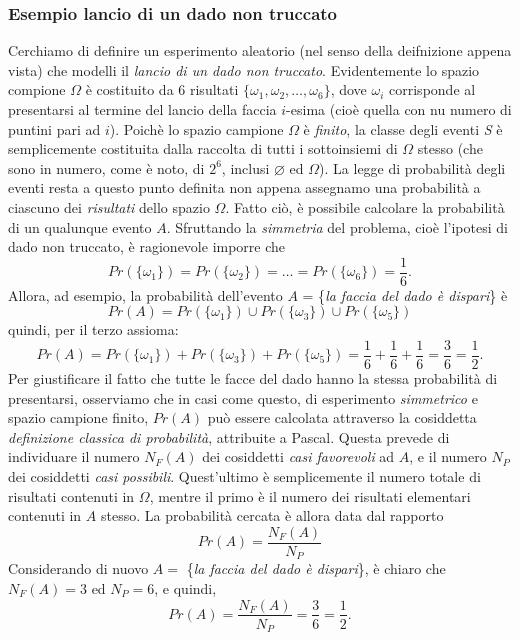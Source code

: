 \documentclass[12pt,oneside,openany]{memoir}
\numberwithin{equation}{subsection}
\begin{document}
\subsubsection{Esempio lancio di un dado non truccato}
Cerchiamo di definire un esperimento aleatorio (nel senso della deifnizione
appena vista) che modelli il \textit{lancio di un dado non truccato}.
Evidentemente lo spazio compione $\Omega$ \`e costituito da $6$ risultati
$\{\omega_1, \omega_2, \dots, \omega_6\}$, dove $\omega_i$ corrisponde al
presentarsi al termine del lancio della faccia $i$-esima (cio\`e quella con nu
numero di puntini pari ad $i$). Poich\`e lo spazio campione $\Omega$ \`e
\textit{finito}, la classe degli eventi \textit{S} \`e semplicemente costituita
dalla raccolta di tutti i sottoinsiemi di $\Omega$ stesso (che sono in numero,
come \`e noto, di $2^6$, inclusi $\varnothing$ ed $\Omega$). La legge di
probabilit\`a degli eventi resta a questo punto definita non appena assegnamo
una probabilit\`a a ciascuno dei \textit{risultati} dello spazio $\Omega$. Fatto
ci\`o, \`e possibile calcolare la probabilit\`a di un qualunque evento $A$.
Sfruttando la \textit{simmetria} del problema, cio\`e l'ipotesi di dado non
truccato, \`e ragionevole imporre che
\[
    Pr(\{\omega_1\}) = Pr(\{\omega_2\}) = \dots = Pr(\{\omega_6\}) =
    \frac{1}{6}.
\]
Allora, ad esempio, la probabilit\`a dell'evento $A$ = \{\textit{la faccia del
dado \`e dispari}\} \`e
\[
    Pr(A) = Pr(\{\omega_1\}) \cup Pr(\{\omega_3\}) \cup Pr(\{\omega_5\})
\]
quindi, per il terzo assioma:
\[
    Pr(A) = Pr(\{\omega_1\}) + Pr(\{\omega_3\}) + Pr(\{\omega_5\}) = \frac{1}{6}
    + \frac{1}{6} + \frac{1}{6} = \frac{3}{6} = \frac{1}{2}.
\]
Per giustificare il fatto che tutte le facce del dado hanno la stessa
probabilit\`a di presentarsi, osserviamo che in casi come questo, di esperimento
\textit{simmetrico} e spazio campione finito, $Pr(A)$ pu\`o essere calcolata
attraverso la cosiddetta \textit{definizione classica di probabilit\`a},
attribuite a Pascal. Questa prevede di individuare il numero $N_F(A)$ dei
cosiddetti \textit{casi favorevoli} ad $A$, e il numero $N_P$ dei cosiddetti
\textit{casi possibili}. Quest'ultimo \`e semplicemente il numero totale di 
risultati contenuti in $\Omega$, mentre il primo \`e il numero dei risultati 
elementari contenuti in $A$ stesso. La probabilit\`a cercata \`e allora data dal
rapporto
\[
    Pr(A) = \frac{N_F(A)}{N_P}
\]
Considerando di nuovo $A =$ \{\textit{la faccia del dado \`e dispari}\}, \`e
chiaro che $N_F(A) = 3$ ed $N_P = 6$, e quindi,
\[
    Pr(A) = \frac{N_F(A)}{N_P} = \frac{3}{6} = \frac{1}{2}.
\]
\end{document}
